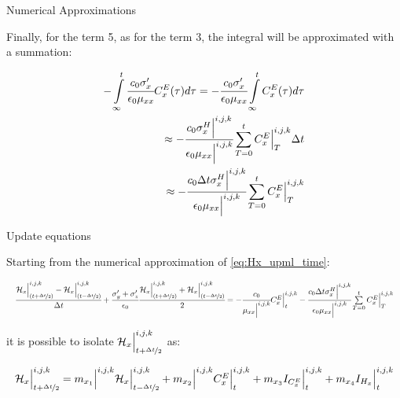 \documentclass{beamer}
\begin{document}
\begin{frame}{Numerical Approximations}
  
  Finally, for the term 5, as for the term 3, the integral will be approximated with a summation:

  \begin{align}
      - \int\limits_{\infty}^t\cfrac{c_0\sigma_x^{\prime}}{\epsilon_0\mu_{xx}}C_x^E(\tau)d\tau = - \cfrac{c_0\sigma_x^{\prime}}{\epsilon_0\mu_{xx}} \int\limits_{\infty}^tC_x^E(\tau)d\tau \nonumber \\
      \approx - \cfrac{c_0\sigma_x^H\Big|^{i,j,k}}{\epsilon_0\mu_{xx}\Big|^{i,j,k}} \sum\limits_{T=0}^{t}C_x^E\Big|^{i,j,k}_{T}\Delta t \nonumber \\
      \approx - \cfrac{c_0\Delta t\sigma_x^H\Big|^{i,j,k}}{\epsilon_0\mu_{xx}\Big|^{i,j,k}} \sum\limits_{T=0}^{t}C_x^E\Big|^{i,j,k}_{T}
  \end{align}

\end{frame}

\begin{frame}{Update equations}
  
  Starting from the numerical approximation of \eqref{eq:Hx_upml_time}:

  \begin{align*}
    \resizebox{\hsize}{!}{$
      \cfrac{\Hht_x\Big|_{(t+\nicefrac{\dt}{2})}^{i,j,k}-\Hht_x\Big|^{i,j,k}_{(t-\nicefrac{\dt}{2})}}{\dt}
      + \cfrac{\sigma_y\Prime + \sigma_z\Prime}{\epsilon_0}\cfrac{\Hht_x\Big|_{(t+\nicefrac{\dt}{2})}^{i,j,k}+\Hht_x\Big|^{i,j,k}_{(t-\nicefrac{\dt}{2})}}{2}
      = -\cfrac{c_0}{\mu_{xx}\Big|^{i,j,k}}\CEx\Big|^{i,j,k}_{t} - \cfrac{c_0\dt\sigma_x^H\Big|^{i,j,k}}{\epsilon_0\mu_{xx}\Big|^{i,j,k}} \sum\limits_{T=0}^{t}\CEx\Big|^{i,j,k}_{T}
    $}
  \end{align*}

  it is possible to isolate $ \mathcal{H}_x\Big|_{t+\nicefrac{\Delta t}{2}}^{i,j,k}$ as:

  \begin{align}
    \resizebox{\hsize}{!}{$
      \Hht_x\Big|_{t+\nicefrac{\dt}{2}}^{i,j,k} = \mxone\Big|^{i,j,k} \Hht_x\Big|_{t-\nicefrac{\dt}{2}}^{i,j,k} 
      + \mxtwo\Big|^{i,j,k}\CEx\Big|^{i,j,k}_{t} + \mxthree \ICEx\Big|^{i,j,k}_{t} 
      + \mxfour \IHx\Big|^{i,j,k}_{t}
    $}
  \end{align}

\end{frame}
\end{document}
